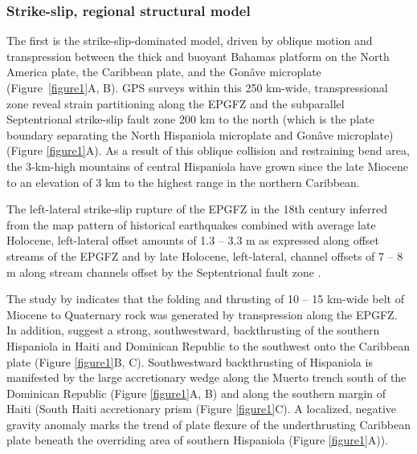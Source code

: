 \documentclass[linenumbers,draft]{agujournal}
\begin{document}
\subsubsection{Strike-slip, regional structural model}
The first is the strike-slip-dominated model, driven by oblique motion and transpression between the thick and buoyant Bahamas platform on the North America plate, the Caribbean plate, and the Gon\^ave microplate \citep{mann1995actively,dolan1998active,mann2002oblique,calais2002strain,calais2016plate} (Figure~\ref{figure1}A, B). GPS surveys within this 250 km-wide, transpressional zone \citep{calais2002strain,calais2010transpressional,hayes2010complex,symithe2013coseismic,douilly2013crustal,douilly2015three} reveal strain partitioning along the EPGFZ and the subparallel Septentrional strike-slip fault zone 200 km to the north (which is the plate boundary separating the North Hispaniola microplate and Gon\^ave microplate) (Figure {\ref{figure1}}A). As a result of this oblique collision and restraining bend area, the 3-km-high mountains of central Hispaniola have grown since the late Miocene to an elevation of 3 km to the highest range in the northern Caribbean. 

The left-lateral strike-slip rupture of the EPGFZ in the 18th century inferred from the map pattern of historical earthquakes \citep{bakun2012significant} combined with average late Holocene, left-lateral offset amounts of 1.3 -- 3.3 m as expressed along offset streams of the EPGFZ \citep{prentice2010seismic} and by late Holocene, left-lateral, channel offsets of 7 -- 8 m along stream channels offset by the Septentrional fault zone \citep{prentice1993paleoseismicity,prentice2003slip}. 

The study by \citet{saint2015seismotectonics} indicates that the folding and thrusting of 10 -- 15 km-wide belt of Miocene to Quaternary rock was generated by transpression along the EPGFZ. In addition, \citet{mann2002oblique,grindlay2005high,kroehler2011late} suggest a strong, southwestward, backthrusting of the southern Hispaniola in Haiti and Dominican Republic to the southwest onto the Caribbean plate (Figure \ref{figure1}B, C). Southwestward backthrusting of Hispaniola is manifested by the large accretionary wedge along the Muerto trench south of the Dominican Republic \citep{bien1986contribution,bruna2009morphotectonics} (Figure \ref{figure1}A, B) and along the southern margin of Haiti (South Haiti accretionary prism \citep{bien1986contribution} (Figure \ref{figure1}C). A localized, negative gravity anomaly marks the trend of plate flexure of the underthrusting Caribbean plate beneath the overriding area of southern Hispaniola \citep{mann2002oblique,bruna2009morphotectonics} (Figure \ref{figure1}A)).
\end{document}
